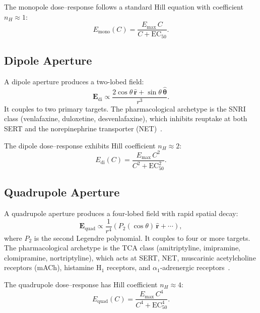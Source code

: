 \documentclass[10pt,twocolumn]{article}
\theoremstyle{definition}
\theoremstyle{remark}
\begin{document}
The monopole dose--response follows a standard Hill equation
with coefficient $n_H \approx 1$:
\begin{equation}
  E_{\text{mono}}(C) = \frac{E_{\max}\, C}{C + \mathrm{EC}_{50}}.
\end{equation}

\subsection{Dipole Aperture}

A dipole aperture produces a two-lobed field:
\begin{equation}
  \mathbf{E}_{\text{di}} \propto
  \frac{2\cos\theta\,\hat{\mathbf{r}} + \sin\theta\,\hat{\boldsymbol{\theta}}}{r^3}.
\end{equation}
It couples to two primary targets.  The pharmacological archetype
is the SNRI class (venlafaxine, duloxetine, desvenlafaxine),
which inhibits reuptake at both SERT and the norepinephrine
transporter (NET)~\cite{Stahl2021,Owens1997}.

The dipole dose--response exhibits Hill coefficient $n_H \approx 2$:
\begin{equation}
  E_{\text{di}}(C) = \frac{E_{\max}\, C^2}{C^2 + \mathrm{EC}_{50}^2}.
\end{equation}

\subsection{Quadrupole Aperture}

A quadrupole aperture produces a four-lobed field with rapid
spatial decay:
\begin{equation}
  \mathbf{E}_{\text{quad}} \propto \frac{1}{r^4}
  \left(P_2(\cos\theta)\,\hat{\mathbf{r}} + \cdots\right),
\end{equation}
where $P_2$ is the second Legendre polynomial.  It couples to
four or more targets.  The pharmacological archetype is the TCA
class (amitriptyline, imipramine, clomipramine, nortriptyline),
which acts at SERT, NET, muscarinic acetylcholine receptors (mACh),
histamine H$_1$ receptors, and $\alpha_1$-adrenergic
receptors~\cite{Stahl2021,Roth2004,Owens1997}.

The quadrupole dose--response has Hill coefficient $n_H \approx 4$:
\begin{equation}
  E_{\text{quad}}(C) = \frac{E_{\max}\, C^4}{C^4 + \mathrm{EC}_{50}^4}.
\end{equation}
\end{document}
